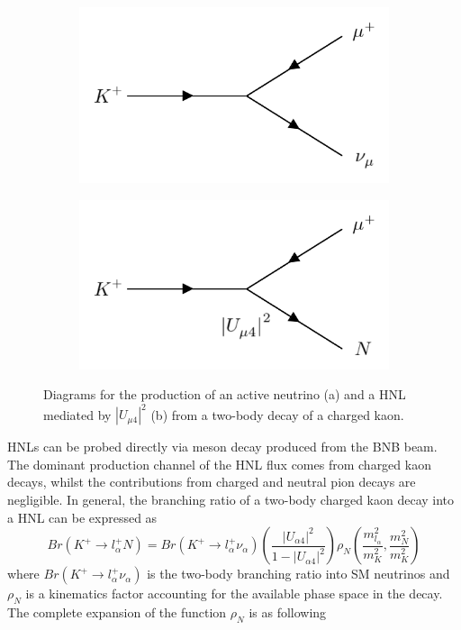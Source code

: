 \begin{figure}[htbp!]
\begin{subfigure}[h]{0.4\linewidth}
\centering    
\includegraphics[width=\linewidth]{K_to_nu}
\caption{}
\end{subfigure}
\hfill
\begin{subfigure}[h]{0.4\linewidth}
\centering    
\includegraphics[width=\linewidth]{K_to_HNL}
\caption{}
\end{subfigure}%
\caption[kaonDiagram]{
Diagrams for the production of an active neutrino (a) and a HNL mediated by $|U_{\mu4}|^{2}$ (b) from a two-body decay of a charged kaon.
}\label{fig:kaonDiagram}
\end{figure}

HNLs can be probed directly via meson decay produced from the BNB beam.
The dominant production channel of the HNL flux comes from charged kaon decays, whilst the contributions from charged and neutral pion decays are negligible. 
In general, the branching ratio of a two-body charged kaon decay into a HNL can be expressed as \cite{HNLKelly}
\begin{equation}
	Br(K^{+}\rightarrow l^{+}_{\alpha}N) = Br(K^{+}\rightarrow l^{+}_{\alpha}\nu_{\alpha})\left(\frac{|U_{\alpha 4}|^{2}}{1 - |U_{\alpha 4}|^{2}}\right)\rho_{N}\left(\frac{m^{2}_{l_{\alpha}}}{m^{2}_{K}}, \frac{m^{2}_{N}}{m^{2}_{K}} \right) 
\end{equation}
where $Br(K^{+}\rightarrow l^{+}_{\alpha}\nu_{\alpha})$ is the two-body branching ratio into SM neutrinos and $\rho_{N}$ is a kinematics factor accounting for the available phase space in the decay. The complete expansion of the function $\rho_{N}$ is as following 


